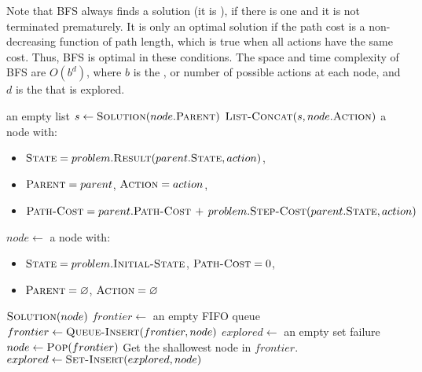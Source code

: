 Note that \ac{BFS} always finds a solution (it is ), if
there is one and it is not terminated prematurely. It is only an optimal
solution if the path cost is a non-decreasing function of path length, which is
true when all actions have the same cost. Thus, \ac{BFS} is optimal in these
conditions. The space and time complexity of \ac{BFS} are $O(b^d)$, where $b$ is
the , or number of possible actions at each node,
and $d$ is the  that is explored.

\citep[Sections~3.3,~3.4]{russell2009aima}

\begin{algorithm}[hbtp]
\begin{algorithmic}
      \Return an empty list
    \EndIf
      \State $s \gets \Call{Solution}{node.\textsc{Parent}}$
      \State \Return $\Call{List-Concat}{s, node.\textsc{Action}}$
  \EndFunction
    \State \Return a node with:
      \begin{itemize}
        \item[] $\textsc{State} = problem.\Call{Result}{parent.\textsc{State}, action}$,
        \item[] $\textsc{Parent} = parent$, $\textsc{Action}=action$,
        \item[] $\textsc{Path-Cost} = parent.\textsc{Path-Cost} \,+\,
          problem.\Call{Step-Cost}{parent.\textsc{State}, action}$
      \end{itemize}
  \EndFunction
    \State $node \gets$ a node with:
      \begin{itemize}
        \item[] $\textsc{State} = problem.\textsc{Initial-State}$, $\textsc{Path-Cost}=0$,
        \item[] $\textsc{Parent} = \varnothing$, $\textsc{Action} = \varnothing$
      \end{itemize}
      \Return $\Call{Solution}{node}$
    \EndIf
    \State $frontier \gets$ an empty \ac{FIFO} queue
    \State $frontier \gets \Call{Queue-Insert}{frontier, node}$
    \State $explored \gets$ an empty set
    \Loop
        \Return failure
      \EndIf
      \State $node \gets \Call{Pop}{frontier}$ \Comment Get the shallowest node
      in $frontier$.
      \State $explored \gets \Call{Set-Insert}{explored, node}$

\end{algorithmic}
\end{algorithm}

